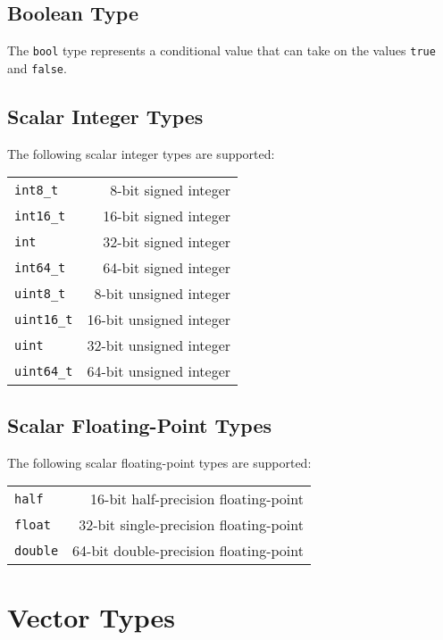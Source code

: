 \subsection{Boolean Type}

The \lstinline|bool| type represents a conditional value that can take on the values \lstinline|true| and \lstinline|false|.

\subsection{Scalar Integer Types}

The following scalar integer types are supported:

\begin{tabular}{lr}
\lstinline|int8_t|   &  8-bit signed integer   \\
\lstinline|int16_t|  & 16-bit signed integer   \\
\lstinline|int|      & 32-bit signed integer   \\
\lstinline|int64_t|  & 64-bit signed integer   \\
\lstinline|uint8_t|  &  8-bit unsigned integer \\
\lstinline|uint16_t| & 16-bit unsigned integer \\
\lstinline|uint|     & 32-bit unsigned integer \\
\lstinline|uint64_t| & 64-bit unsigned integer \\
\end{tabular}

\subsection{Scalar Floating-Point Types}

The following scalar floating-point types are supported:

\begin{tabular}{lr}
\lstinline|half| & 16-bit half-precision floating-point \\
\lstinline|float| & 32-bit single-precision floating-point \\
\lstinline|double| & 64-bit double-precision floating-point \\
\end{tabular}

\section{Vector Types}

